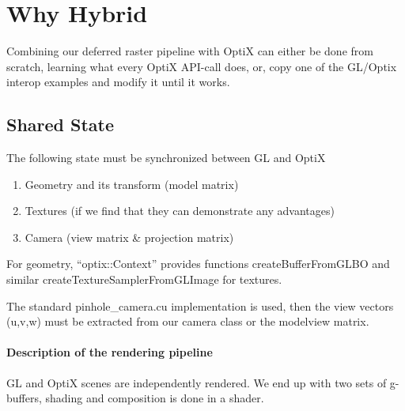 
\section{Why Hybrid}


Combining our deferred raster pipeline with OptiX can either be done from scratch, learning what every OptiX API-call does, or, copy one of the GL/Optix interop examples and modify it until it works. 

\subsection{Shared State}

The following state must be synchronized between GL and OptiX

\begin{enumerate}
	\item Geometry and its transform (model matrix)
	\item Textures (if we find that they can demonstrate any advantages)
	\item Camera (view matrix \& projection matrix)
\end{enumerate}

For geometry, ``optix::Context'' provides functions createBufferFromGLBO and similar createTextureSamplerFromGLImage for textures.

The standard pinhole\_camera.cu implementation is used, then the view vectors (u,v,w) must be extracted from our camera class or the modelview matrix.

\paragraph{Description of the rendering pipeline}

GL and OptiX scenes are independently rendered. We end up with two sets of g-buffers, shading and composition is done in a shader.

